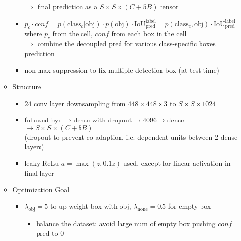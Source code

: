 \begin{itemize}
\begin{itemize}
\begin{itemize}
		$\Rightarrow$ final prediction as a $S\times S \times (C+5B)$ tensor
		\item $p_c\cdot conf = p(\text{class}_c|\text{obj})\cdot p(\text{obj})\cdot \text{IoU}^\text{label}_\text{pred} = p(\text{class}_c, \text{obj}) \cdot \text{IoU}^\text{label}_\text{pred}$ \\
		where $p_c$ from the cell, $conf$ from each box in the cell \\
		$\Rightarrow$ combine the decoupled pred for various class-specific boxes prediction
		\item non-max suppression to fix multiple detection box (at test time)
		\end{itemize}
	\item Structure
		\begin{itemize}
		\item $24$ conv layer downsampling from $448\times448\times3$ to $S\times S\times 1024$
		\item followed by: $\rightarrow$dense with dropout$\rightarrow4096\rightarrow$dense$\rightarrow S\times S\times (C+5B)$ \\
		(dropout to prevent co-adaption, i.e. dependent units between 2 dense layers)
		\item leaky ReLu $a=\max(z,0.1z)$ used, except for linear activation in final layer
		\end{itemize}
	\item Optimization Goal
		\begin{itemize}
		\Item \begin{align*} \displaystyle \text{loss} = & \lambda_\text{obj}\sum_{i=0}^{S^2}\sum_{j=0}^{B} \mathbf{1}^{obj}_{ij} [(x_i-\hat x_i)^2 + (y_i-\hat y_i)^2] +\\
		& \lambda_\text{obj}\sum_{i=0}^{S^2}\sum_{j=0}^{B}\mathbf 1^{obj}_{ij} [(\sqrt{w_i}-\sqrt{\hat w_i})^2 + (\sqrt{h_i}-\sqrt{\hat h_i})^2] + \\
		& \sum_{i=0}^{S^2}\sum_{j=0}^{B}\mathbf 1^{obj}_{ij} (conf_{ij} - \hat {conf}_{ij})^2 + \lambda_\text{none}\cdot\mathbf 1^{none}_{ij} (conf_{ij} - \hat {conf}_{ij})^2 +\\
		& \sum_{i=0}^{S^2}\mathbf 1^{obj}_{i}\sum_{c=0}^C (p_{ci} - \hat p_{ci})^2 \end{align*}
		\item $\lambda_\text{obj} = 5$ to up-weight box with obj, $\lambda_\text{none}=0.5$ for empty box
			\begin{itemize}
			\item balance the dataset: avoid large num of empty box pushing $conf$ pred to $0$

\end{itemize}
\end{itemize}
\end{itemize}
\end{itemize}
